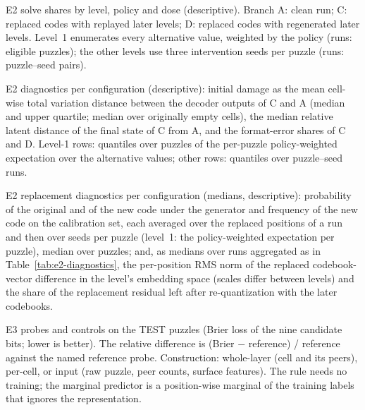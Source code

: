 \begin{table}[htbp]
\centering
\caption{E2 solve shares by level, policy and dose (descriptive). Branch A: clean run; C: replaced codes with replayed later levels; D: replaced codes with regenerated later levels. Level~1 enumerates every alternative value, weighted by the policy (runs: eligible puzzles); the other levels use three intervention seeds per puzzle (runs: puzzle--seed pairs).}
\label{tab:e2-dose}
\footnotesize
{}
\end{table}

\begin{table}[htbp]
\centering
\caption{E2 diagnostics per configuration (descriptive): initial damage as the mean cell-wise total variation distance between the decoder outputs of C and A (median and upper quartile; median over originally empty cells), the median relative latent distance of the final state of C from A, and the format-error shares of C and D. Level-1 rows: quantiles over puzzles of the per-puzzle policy-weighted expectation over the alternative values; other rows: quantiles over puzzle--seed runs.}
\label{tab:e2-diagnostics}
\scriptsize
\setlength{\tabcolsep}{3pt}
\end{table}

\begin{table}[htbp]
\centering
\caption{E2 replacement diagnostics per configuration (medians, descriptive): probability of the original and of the new code under the generator and frequency of the new code on the calibration set, each averaged over the replaced positions of a run and then over seeds per puzzle (level~1: the policy-weighted expectation per puzzle), median over puzzles; and, as medians over runs aggregated as in Table~\ref{tab:e2-diagnostics}, the per-position RMS norm of the replaced codebook-vector difference in the level's embedding space (scales differ between levels) and the share of the replacement residual left after re-quantization with the later codebooks.}
\label{tab:e2-replacement}
\scriptsize
\setlength{\tabcolsep}{3pt}
\end{table}

\begin{table}[htbp]
\centering
\caption{E3 probes and controls on the TEST puzzles (Brier loss of the nine candidate bits; lower is better). The relative difference is (Brier $-$ reference) / reference against the named reference probe. Construction: whole-layer (cell and its peers), per-cell, or input (raw puzzle, peer counts, surface features). The rule needs no training; the marginal predictor is a position-wise marginal of the training labels that ignores the representation.}
\label{tab:e3-matrix}
\scriptsize
\setlength{\tabcolsep}{2pt}
\end{table}

